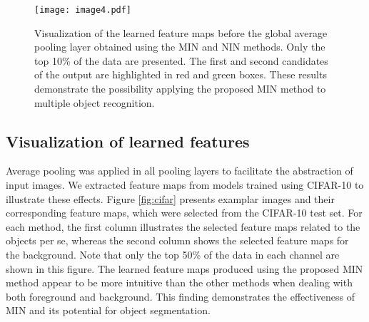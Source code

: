 \documentclass[10pt,twocolumn,letterpaper]{article}
\begin{document}
\begin{figure*}
\begin{center}
	\texttt{[image: image4.pdf]}
\end{center}
   \caption{Visualization of the learned feature maps before the global average pooling layer obtained using the MIN and NIN methods. Only the top 10\% of the data are presented. The first and second candidates of the output are highlighted in red and green boxes. These results demonstrate the possibility applying the proposed MIN method to multiple object recognition.}
\label{fig:svhn}
\end{figure*}

\subsection{Visualization of learned features}
 Average pooling was applied in all pooling layers to facilitate the abstraction of input images. We extracted feature maps from models trained using CIFAR-10 to illustrate these effects. Figure \ref{fig:cifar} presents examplar images and their corresponding feature maps, which were selected from the CIFAR-10 test set. For each method, the first column illustrates the selected feature maps related to the objects per se, whereas the second column shows the selected feature maps for the background.  Note that only the top 50\% of the data in each channel are shown in this figure. The learned feature maps produced using the proposed MIN method appear to be more intuitive than the other methods when dealing with both foreground and background. This finding demonstrates the effectiveness of MIN and its potential for object segmentation.
\end{document}
